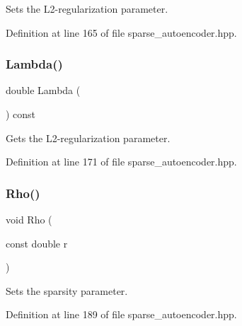 Sets the L2-\/regularization parameter. 



Definition at line 165 of file sparse\+\_\+autoencoder.\+hpp.

\mbox{\label{classmlpack_1_1nn_1_1SparseAutoencoder_a53535041275cedd0ec3de67ca032aa94}} 
\subsubsection{Lambda()\hspace{0.1cm}{\footnotesize\ttfamily [2/2]}}
{\footnotesize\ttfamily double Lambda (\begin{DoxyParamCaption}{ }\end{DoxyParamCaption}) const\hspace{0.3cm}{\ttfamily [inline]}}



Gets the L2-\/regularization parameter. 



Definition at line 171 of file sparse\+\_\+autoencoder.\+hpp.

\mbox{\label{classmlpack_1_1nn_1_1SparseAutoencoder_a97ac05cf618f1f137a4aa8fcd4e48539}} 
\subsubsection{Rho()\hspace{0.1cm}{\footnotesize\ttfamily [1/2]}}
{\footnotesize\ttfamily void Rho (\begin{DoxyParamCaption}\item[{const double}]{r }\end{DoxyParamCaption})\hspace{0.3cm}{\ttfamily [inline]}}



Sets the sparsity parameter. 



Definition at line 189 of file sparse\+\_\+autoencoder.\+hpp.

\mbox{\label{classmlpack_1_1nn_1_1SparseAutoencoder_a309719b378c0bb1962982a8162e58e84}} 
